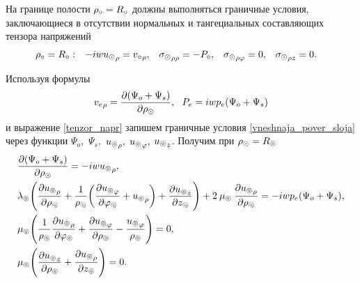 На границе полости $\rho_\circ=R_\circ$ должны выполняться граничные условия, заключающиеся в отсутствии нормальных и тангециальных составляющих тензора напряжений
\begin{equation}\label{gran_pol}
\begin{aligned}
\rho_\circ &=R_\circ: &-iw{u_\odot}_{\rho}&={v_\circ}_{\rho}, &{\sigma_\odot}_{\rho\rho}&=-P_\circ, &{\sigma_\odot}_{\rho\varphi}&=0, &{\sigma_\odot}_{\rho z}&=0.
\end{aligned}
\end{equation}

Используя формулы
$${v_e}_{\rho}=\frac{\partial(\Psi_{o}+\Psi_s)}{\partial\rho_\odot},\:\:\: P_e=iwp_e(\Psi_{o}+\Psi_s)$$
и выражение \eqref{tenzor_napr} запишем граничные условия \eqref{vneshnaja_pover_sloja} через функции $\Psi_{o},$ $\Psi_s,$ ${u_\circledcirc}_\rho,$ ${u_\circledcirc}_\varphi,$ ${u_\circledcirc}_z$. Получим при $\rho_\odot=R_\circledcirc$
\begin{align}
&\frac{\partial(\Psi_{o}+\Psi_s)}{\partial\rho_\odot}=-iw{u_\circledcirc}_{\rho},\\
&\lambda_\circledcirc\Biggl(\frac{\partial {u_\circledcirc}_{\rho}}{\partial \rho_\circledcirc}+\frac{1}{\rho_\circledcirc}\biggl(\frac{\partial {u_\circledcirc}_\varphi}{\partial\varphi_\circledcirc}+{u_\circledcirc}_{\rho}\biggr)+\frac{\partial {u_\circledcirc}_z}{\partial z_\circledcirc}\Biggr)+2\:\mu_\circledcirc\:\frac{\partial {u_\circledcirc}_{\rho}}{\partial \rho_\circledcirc}=-iwp_e(\Psi_{o}+\Psi_s),\\
&\mu_\circledcirc\Biggl(\frac{1}{\rho_\circledcirc}\frac{\partial {u_\circledcirc}_{\rho}}{\partial\varphi_\circledcirc}+\frac{\partial {u_\circledcirc}_{\varphi}}{\partial \rho_\circledcirc}-\frac{{u_\circledcirc}_{\varphi}}{\rho_\circledcirc}\Biggr)=0,\\
&\mu_\circledcirc\Biggl(\frac{\partial {u_\circledcirc}_z}{\partial \rho_\circledcirc}+\frac{\partial {u_\circledcirc}_{\rho}}{\partial z_\circledcirc}\Biggr)=0.\\
\end{align}

